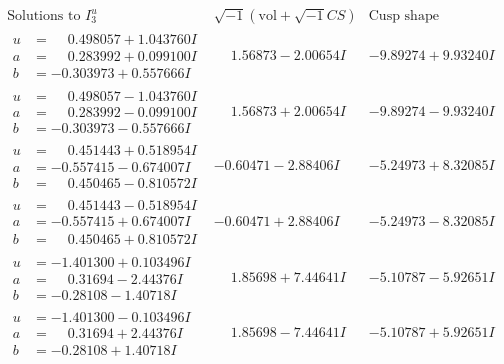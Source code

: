 \documentclass[1p]{elsarticle_modified}
\theoremstyle{definition}
\newcommand{\I}{\sqrt{-1}}
\begin{document}
$$\begin{array}{c|c|c}  
\text{Solutions to }I^u_{3}& \I (\text{vol} + \sqrt{-1}CS) & \text{Cusp shape}\\
 \hline 
\begin{aligned}
u &= \phantom{-}0.498057 + 1.043760 I \\
a &= \phantom{-}0.283992 + 0.099100 I \\
b &= -0.303973 + 0.557666 I\end{aligned}
 & \phantom{-}1.56873 - 2.00654 I & -9.89274 + 9.93240 I \\ \hline\begin{aligned}
u &= \phantom{-}0.498057 - 1.043760 I \\
a &= \phantom{-}0.283992 - 0.099100 I \\
b &= -0.303973 - 0.557666 I\end{aligned}
 & \phantom{-}1.56873 + 2.00654 I & -9.89274 - 9.93240 I \\ \hline\begin{aligned}
u &= \phantom{-}0.451443 + 0.518954 I \\
a &= -0.557415 - 0.674007 I \\
b &= \phantom{-}0.450465 - 0.810572 I\end{aligned}
 & -0.60471 - 2.88406 I & -5.24973 + 8.32085 I \\ \hline\begin{aligned}
u &= \phantom{-}0.451443 - 0.518954 I \\
a &= -0.557415 + 0.674007 I \\
b &= \phantom{-}0.450465 + 0.810572 I\end{aligned}
 & -0.60471 + 2.88406 I & -5.24973 - 8.32085 I \\ \hline\begin{aligned}
u &= -1.401300 + 0.103496 I \\
a &= \phantom{-}0.31694 - 2.44376 I \\
b &= -0.28108 - 1.40718 I\end{aligned}
 & \phantom{-}1.85698 + 7.44641 I & -5.10787 - 5.92651 I \\ \hline\begin{aligned}
u &= -1.401300 - 0.103496 I \\
a &= \phantom{-}0.31694 + 2.44376 I \\
b &= -0.28108 + 1.40718 I\end{aligned}
 & \phantom{-}1.85698 - 7.44641 I & -5.10787 + 5.92651 I \\ \hline\begin{aligned}

\end{aligned}
\end{array}$$
\end{document}
